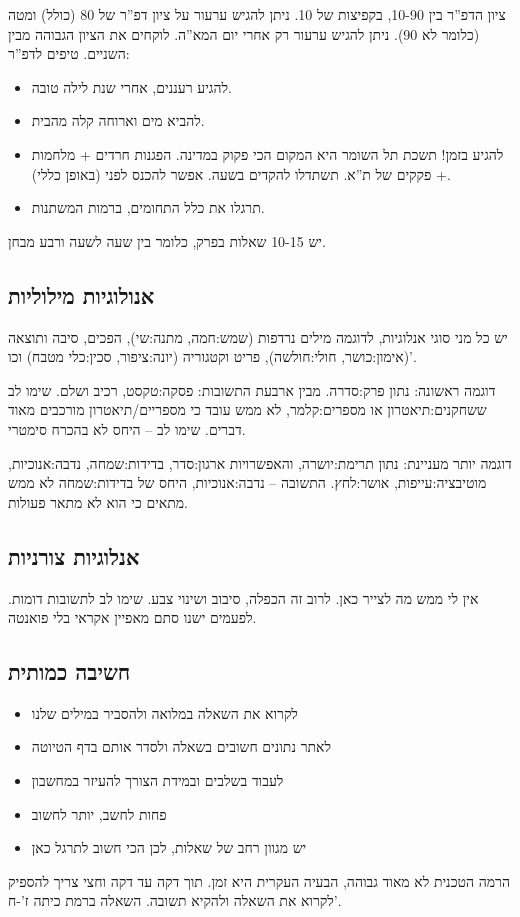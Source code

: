 \documentclass[]{article}
\begin{document}
	ציון הדפ''ר בין 10-90, בקפיצות של 10. ניתן להגיש ערעור על ציון דפ''ר של 80 (כולל) ומטה (כלומר לא 90). ניתן להגיש ערעור רק אחרי יום המא''ה. לוקחים את הציון הגבוהה מבין השניים. טיפים לדפ''ר: 
	
	\begin{itemize}
		\item להגיע רעננים, אחרי שנת לילה טובה. 
		\item להביא מים וארוחה קלה מהבית. 
		\item להגיע בזמן! תשכת תל השומר היא המקום הכי פקוק במדינה. הפגנות חרדים + מלחמות + פקקים של ת''א. תשתדלו להקדים בשעה. אפשר להכנס לפני (באופן כללי). 
		\item תרגלו את כלל התחומים, ברמות המשתנות. 
	\end{itemize}
	
	יש 10-15 שאלות בפרק, כלומר בין שעה לשעה ורבע מבחן. 
	
	\subsection{אנולוגיות מילוליות}
	יש כל מני סוגי אנלוגיות, לדוגמה מילים נרדפות (שמש:חמה, מתנה:שי), הפכים, סיבה ותוצאה (אימון:כושר, חולי:חולשה), פריט וקטגוריה (יונה:ציפור, סכין:כלי מטבח) וכו'. 
	
	דוגמה ראשונה: נתון פרק:סדרה. מבין ארבעת התשובות: פסקה:טקסט, רכיב ושלם. שימו לב ששחקנים:תיאטרון או מספרים:קלמר, לא ממש עובד כי מספריים/תיאטרון מורכבים מאוד דברים. שימו לב – היחס לא בהכרח סימטרי. 
	
	דוגמה יותר מעניינת: נתון תרימת:יושרה, והאפשרויות ארגון:סדר, בדידות:שמחה, נדבה:אנוכיות, מוטיבציה:עייפות, אושר:לחץ. התשובה – נדבה:אנוכיות, היחס של בדידות:שמחה לא ממש מתאים כי הוא לא מתאר פעולות. 
	
	
	\subsection{אנלוגיות צורניות}
	אין לי ממש מה לצייר כאן. לרוב זה הכפלה, סיבוב ושינוי צבע. שימו לב לתשובות דומות. לפעמים ישנו סתם מאפיין אקראי בלי פואנטה. 
	
	\subsection{חשיבה כמותית}
	\begin{itemize}
		\item לקרוא את השאלה במלואה ולהסביר במילים שלנו
		\item לאתר נתונים חשובים בשאלה ולסדר אותם בדף הטיוטה
		\item לעבוד בשלבים ובמידת הצורך להעיזר במחשבון
		\item פחות לחשב, יותר לחשוב
		\item יש מגוון רחב של שאלות, לכן הכי חשוב לתרגל כאן
	\end{itemize}
	הרמה הטכנית לא מאוד גבוהה, הבעיה העקרית היא זמן. תוך דקה עד דקה וחצי צריך להספיק לקרוא את השאלה ולהקיא תשובה. השאלה ברמת כיתה ז'-ח'. 
	
\end{document}
